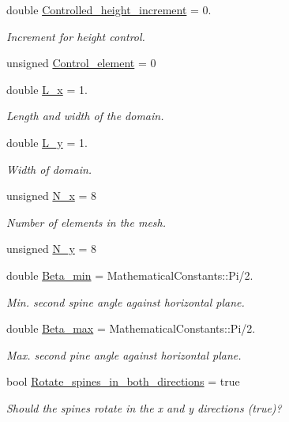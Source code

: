 \begin{DoxyCompactItemize}
double \hyperlink{namespaceGlobalParameters_a65fe7fd6c6c54d7ba89fab47cd4a9141}{Controlled\+\_\+height\+\_\+increment} = 0.
\begin{DoxyCompactList}\small\item\em Increment for height control. \end{DoxyCompactList}\item 
unsigned \hyperlink{namespaceGlobalParameters_a3a90a762edbce6d2a95456df26e85cea}{Control\+\_\+element} = 0
\item 
double \hyperlink{namespaceGlobalParameters_a36ebf514fdd1e78fff69907b39e25af6}{L\+\_\+x} = 1.
\begin{DoxyCompactList}\small\item\em Length and width of the domain. \end{DoxyCompactList}\item 
double \hyperlink{namespaceGlobalParameters_ac8774b3418c4551091d64ec72c169b2e}{L\+\_\+y} = 1.
\begin{DoxyCompactList}\small\item\em Width of domain. \end{DoxyCompactList}\item 
unsigned \hyperlink{namespaceGlobalParameters_ab020cb50fa321b26e8d2127d2cff23b9}{N\+\_\+x} = 8
\begin{DoxyCompactList}\small\item\em Number of elements in the mesh. \end{DoxyCompactList}\item 
unsigned \hyperlink{namespaceGlobalParameters_a711d6f05552ddaac30bd245ae8bdf878}{N\+\_\+y} = 8
\item 
double \hyperlink{namespaceGlobalParameters_aeb7f1ae574be563e0b603662c6fff5aa}{Beta\+\_\+min} = Mathematical\+Constants\+::\+Pi/2.
\begin{DoxyCompactList}\small\item\em Min. second spine angle against horizontal plane. \end{DoxyCompactList}\item 
double \hyperlink{namespaceGlobalParameters_aa34aff6eb29a2a1245e9ffc2fac42caa}{Beta\+\_\+max} = Mathematical\+Constants\+::\+Pi/2.
\begin{DoxyCompactList}\small\item\em Max. second pine angle against horizontal plane. \end{DoxyCompactList}\item 
bool \hyperlink{namespaceGlobalParameters_a69a238365a4fef33b1abdae287185f3e}{Rotate\+\_\+spines\+\_\+in\+\_\+both\+\_\+directions} = true
\begin{DoxyCompactList}\small\item\em Should the spines rotate in the x and y directions (true)? \end{DoxyCompactList}\end{DoxyCompactItemize}


